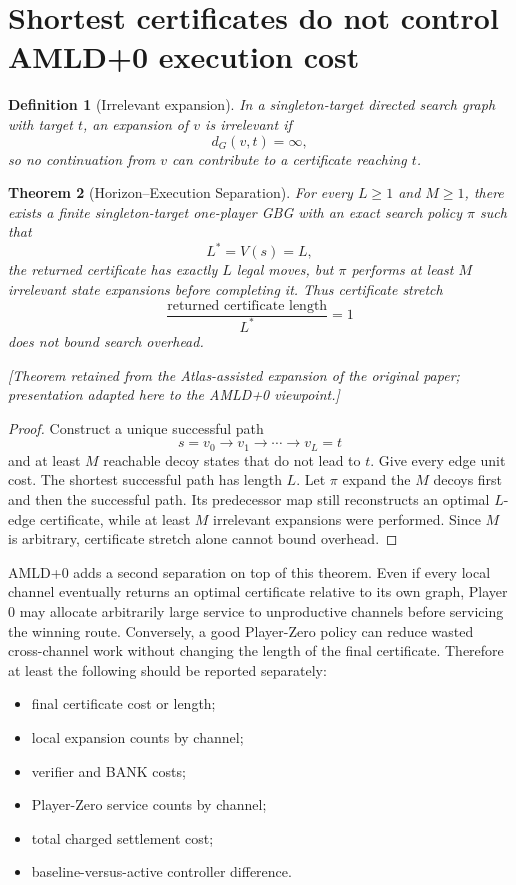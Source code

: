 \documentclass[11pt]{article}
\newtheorem{definition}{Definition}[section]
\newtheorem{theorem}[definition]{Theorem}
\newcommand{\atlasnote}{\par\smallskip\noindent\textit{[Theorem retained from the Atlas-assisted expansion of the original paper; presentation adapted here to the AMLD+0 viewpoint.] }\par\smallskip}
\begin{document}
\section{Shortest certificates do not control AMLD+0 execution cost}

\begin{definition}[Irrelevant expansion]
In a singleton-target directed search graph with target $t$, an expansion of
$v$ is \emph{irrelevant} if
\[
d_G(v,t)=\infty,
\]
so no continuation from $v$ can contribute to a certificate reaching $t$.
\end{definition}

\begin{theorem}[Horizon--Execution Separation]
For every $L\ge1$ and $M\ge1$, there exists a finite singleton-target
one-player GBG with an exact search policy $\pi$ such that
\[
L^*=V(s)=L,
\]
the returned certificate has exactly $L$ legal moves, but $\pi$ performs at
least $M$ irrelevant state expansions before completing it.  Thus certificate
stretch
\[
\frac{\text{returned certificate length}}{L^*}=1
\]
does not bound search overhead.
\end{theorem}
\atlasnote

\begin{proof}
Construct a unique successful path
\[
s=v_0\to v_1\to\cdots\to v_L=t
\]
and at least $M$ reachable decoy states that do not lead to $t$.  Give every
edge unit cost.  The shortest successful path has length $L$.  Let $\pi$
expand the $M$ decoys first and then the successful path.  Its predecessor map
still reconstructs an optimal $L$-edge certificate, while at least $M$
irrelevant expansions were performed.  Since $M$ is arbitrary, certificate
stretch alone cannot bound overhead.
\end{proof}

AMLD+0 adds a second separation on top of this theorem.  Even if every local
channel eventually returns an optimal certificate relative to its own graph,
Player 0 may allocate arbitrarily large service to unproductive channels before
servicing the winning route.  Conversely, a good Player-Zero policy can reduce
wasted cross-channel work without changing the length of the final
certificate.  Therefore at least the following should be reported separately:
\begin{itemize}
    \item final certificate cost or length;
    \item local expansion counts by channel;
    \item verifier and BANK costs;
    \item Player-Zero service counts by channel;
    \item total charged settlement cost;
    \item baseline-versus-active controller difference.
\end{itemize}
\end{document}
